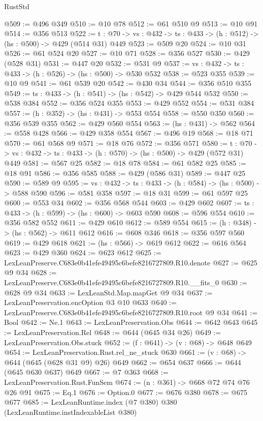 \begin{lexlean}{RustStd}
\begin{coremodule}
@509 := @496 @349
@510 := @10 @78
@512 := @61 @510 @9
@513 := @10 @91
@514 := @356 @513
@522 := {t : @70} -> {vs : @432} -> {ts : @433} -> (h : @512) -> (hs : @500) -> @429 (@514 @31) @449
@523 := @509 @20
@524 := @10 @31
@526 := @61 @524 @20
@527 := @10 @71
@528 := @356 @527
@530 := @429 (@528 @31)
@531 := @447 @20
@532 := @531 @9
@537 := {vs : @432} -> {ts : @433} -> (h : @526) -> (hs : @500) -> @530 @532
@538 := @523 @355
@539 := @10 @9
@541 := @61 @539 @20
@542 := @430 @34
@544 := @356 @510 @355
@549 := {ts : @433} -> (h : @541) -> (hs : @542) -> @429 @544 @532
@550 := @538 @384
@552 := @356 @524 @355
@553 := @429 @552
@554 := @531 @384
@557 := (h : @352) -> (hs : @431) -> @553 @554
@558 := @550 @350
@560 := @356 @539 @355
@562 := @429 @560 @554
@563 := (hs : @431) -> @562
@564 := @558 @428
@566 := @429 @358 @554
@567 := @496 @19
@568 := @18 @71
@570 := @61 @568 @9
@571 := @18 @76
@572 := @356 @571
@580 := {t : @70} -> {vs : @432} -> {ts : @433} -> (h : @570) -> (hs : @500) -> @429 (@572 @31) @449
@581 := @567 @25
@582 := @18 @78
@584 := @61 @582 @25
@585 := @18 @91
@586 := @356 @585
@588 := @429 (@586 @31)
@589 := @447 @25
@590 := @589 @9
@595 := {vs : @432} -> {ts : @433} -> (h : @584) -> (hs : @500) -> @588 @590
@596 := @581 @358
@597 := @18 @31
@599 := @61 @597 @25
@600 := @553 @34
@602 := @356 @568 @544
@603 := @429 @602
@607 := {ts : @433} -> (h : @599) -> (hs : @600) -> @603 @590
@608 := @596 @554
@610 := @356 @582 @552
@611 := @429 @610
@612 := @589 @554
@615 := (h : @348) -> (hs : @562) -> @611 @612
@616 := @608 @346
@618 := @356 @597 @560
@619 := @429 @618
@621 := (hs : @566) -> @619 @612
@622 := @616 @564
@623 := @429 @360
@624 := @623 @612
@625 := LexLeanPreserve.C683e0b41efe49495c6befe8216727809.R10.denote
@627 := @625 @9 @34
@628 := LexLeanPreserve.C683e0b41efe49495c6befe8216727809.R10.__fits_0
@630 := @628 @9 @34
@633 := LexLeanStd.Map.mapGet @9 @34
@637 := LexLeanPreservation.encOption @3 @10 @633
@640 := LexLeanPreserve.C683e0b41efe49495c6befe8216727809.R10.root @9 @34
@641 := Bool
@642 := Ne.{1}
@643 := LexLeanPreservation.Obs
@644 := @642 @643
@645 := LexLeanPreservation.Rel
@648 := @644 (@645 @34 @26)
@649 := LexLeanPreservation.Obs.stuck
@652 := (f : @641) -> (v : @68) -> @648 @649
@654 := LexLeanPreservation.Rust.rel_ne_stuck @630
@661 := (v : @68) -> @644 (@645 (@628 @31 @9) @26) @649
@662 := @654 @637
@666 := @644 (@645 @630 @637) @649
@667 := @7 @363
@668 := LexLeanPreservation.Rust.FunSem
@674 := (n : @361) -> @668 @72 @74 @76 @26 @91
@675 := Eq.{1}
@676 := Option.{0}
@677 := @676 @380
@678 := @675 @677
@685 := LexLeanRuntime.index (@7 @380) @380 (LexLeanRuntime.instIndexableList @380)

\end{coremodule}
\end{lexlean}
